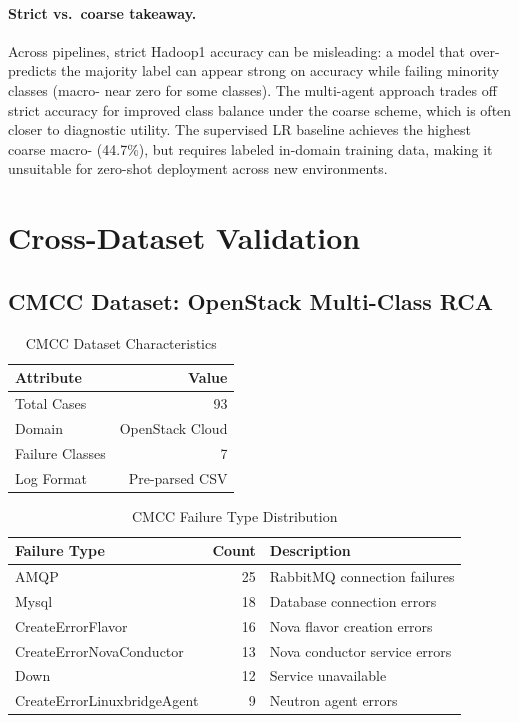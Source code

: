 \paragraph{Strict vs.\ coarse takeaway.}
Across pipelines, strict Hadoop1 accuracy can be misleading: a model that over-predicts the
majority label can appear strong on accuracy while failing minority classes (macro-\fone{} near
zero for some classes). The multi-agent approach trades off strict accuracy for improved class
balance under the coarse scheme, which is often closer to diagnostic utility. The supervised
LR baseline achieves the highest coarse macro-\fone{} (44.7\%), but requires labeled in-domain
training data, making it unsuitable for zero-shot deployment across new environments.

\section{Cross-Dataset Validation}

\subsection{CMCC Dataset: OpenStack Multi-Class RCA}
\label{sec:cmcc-results}

\begin{table}[H]
\centering
\caption{CMCC Dataset Characteristics}
\label{tab:cmcc-dataset}
\begin{tabular}{lr}
\toprule
\textbf{Attribute} & \textbf{Value} \\
\midrule
Total Cases      & 93 \\
Domain           & OpenStack Cloud \\
Failure Classes  & 7 \\
Log Format       & Pre-parsed CSV \\
\bottomrule
\end{tabular}
\end{table}

\begin{table}[H]
\centering
\caption{CMCC Failure Type Distribution}
\label{tab:cmcc-distribution}
\begin{tabular}{lrl}
\toprule
\textbf{Failure Type} & \textbf{Count} & \textbf{Description} \\
\midrule
AMQP                        & 25 & RabbitMQ connection failures \\
Mysql                       & 18 & Database connection errors \\
CreateErrorFlavor           & 16 & Nova flavor creation errors \\
CreateErrorNovaConductor    & 13 & Nova conductor service errors \\
Down                        & 12 & Service unavailable \\
CreateErrorLinuxbridgeAgent &  9 & Neutron agent errors \\
\bottomrule
\end{tabular}
\end{table}

